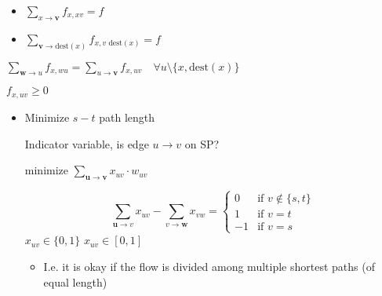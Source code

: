 \begin{itemize}
\begin{itemize}
\begin{itemize}
                        \begin{itemize}
                            \item $\sum_{x \to \textbf{v}} f_{x,xv} = f$
                            \item $\sum_{\textbf{v} \to \text{dest}(x)} f_{x,v \text{ dest}(x)} = f$
                        \end{itemize}
                         $\sum_{\textbf{w} \to u} f_{x, wu} = \sum_{u \to \textbf{v}} f_{x,uv} \quad \forall u \setminus \{x, \text{dest}(x)\}$

                     $f_{x,uv} \ge 0$
                \end{itemize}
        \end{itemize}
        \begin{itemize}
            \item Minimize $s - t$ path length
                \begin{itemize}
                     Indicator variable, is edge $u \to v$ on SP?
                \end{itemize}
                 minimize $\sum_{\mathbf{u \to v}} x_{uv} \cdot w_{uv}$
                \begin{itemize}
                     \[\sum_{\mathbf{u} \to v} x_{uv} - \sum_{v \to \mathbf{w}} x_{vw} =
\begin{cases}
    0 &\text{if } v \not\in \{s, t\}\\
    1 &\text{if } v = t\\
    -1 &\text{if }v = s
\end{cases}\]
                     $x_{uv} \in \{0,1\}$
                     $x_{uv} \in [0,1]$
                        \begin{itemize}
                            \item I.e. it is okay if the flow is divided among multiple shortest paths (of equal length)
                        \end{itemize}
                \end{itemize}
        \end{itemize}
\end{itemize}

